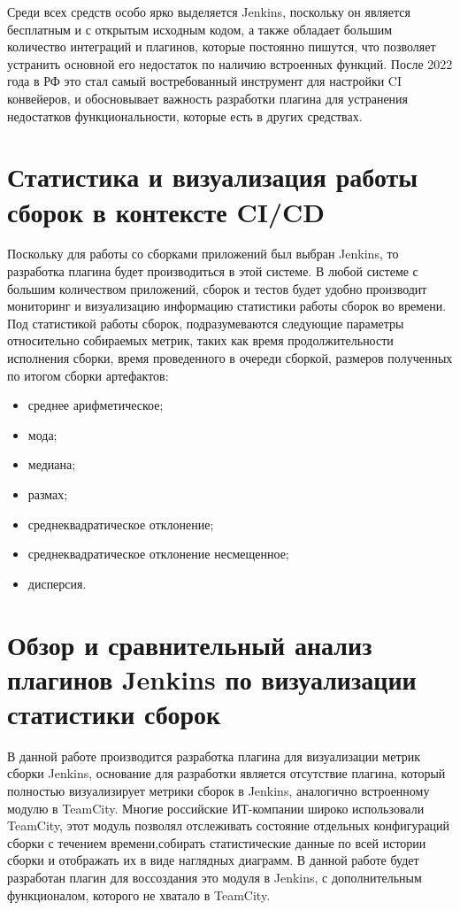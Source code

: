 Среди всех средств особо ярко выделяется Jenkins, поскольку он является бесплатным и с открытым исходным кодом, а также обладает большим количество интеграций и плагинов, которые постоянно пишутся, что позволяет устранить основной его недостаток по наличию встроенных функций. После 2022 года в РФ это стал самый востребованный инструмент для настройки CI конвейеров, и обосновывает важность разработки плагина для устранения недостатков функциональности, которые есть в других средствах.
 
 
 \section{Статистика и визуализация работы сборок в контексте CI/CD} \label{ch1:sec4}
 
Поскольку для работы со сборками приложений был выбран Jenkins, то разработка плагина будет производиться в этой системе. В любой системе с большим количеством приложений, сборок и тестов будет удобно производит мониторинг и визуализацию информацию статистики работы сборок во времени. Под статистикой работы сборок, подразумеваются следующие параметры относительно собираемых метрик, таких как время продолжительности исполнения сборки, время проведенного в очереди сборкой, размеров полученных по итогом сборки артефактов:
 
\begin{itemize}
	\item среднее арифметическое;
	\item мода;
	\item медиана;
	\item размах;
	\item среднеквадратическое отклонение;
	\item среднеквадратическое отклонение несмещенное;
	\item дисперсия.
\end{itemize}
 
	
\section{Обзор и сравнительный анализ плагинов Jenkins по визуализации статистики сборок} \label{ch1:sec5}

В данной работе производится разработка плагина для визуализации метрик сборки Jenkins, основание для разработки является отсутствие плагина, который полностью визуализирует метрики сборок в Jenkins, аналогично встроенному модулю в TeamCity. Многие российские ИТ-компании широко использовали TeamCity, этот модуль позволял отслеживать состояние отдельных конфигураций сборки с течением времени,собирать статистические данные по всей истории сборки и отображать их в виде наглядных диаграмм. В данной работе будет разработан плагин для воссоздания это модуля в Jenkins, с дополнительным функционалом, которого не хватало в TeamCity.

